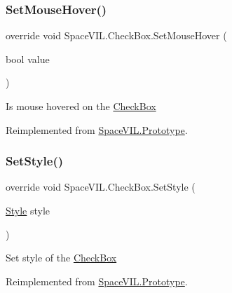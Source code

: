 \subsubsection{\texorpdfstring{Set\+Mouse\+Hover()}{SetMouseHover()}}
{\footnotesize\ttfamily override void Space\+V\+I\+L.\+Check\+Box.\+Set\+Mouse\+Hover (\begin{DoxyParamCaption}\item[{bool}]{value }\end{DoxyParamCaption})\hspace{0.3cm}{\ttfamily [virtual]}}



Is mouse hovered on the \mbox{\hyperlink{class_space_v_i_l_1_1_check_box}{Check\+Box}} 



Reimplemented from \mbox{\hyperlink{class_space_v_i_l_1_1_prototype}{Space\+V\+I\+L.\+Prototype}}.

\mbox{\label{class_space_v_i_l_1_1_check_box_a123c8ba848fb10601c5ee80681410f23}} 
\subsubsection{\texorpdfstring{Set\+Style()}{SetStyle()}}
{\footnotesize\ttfamily override void Space\+V\+I\+L.\+Check\+Box.\+Set\+Style (\begin{DoxyParamCaption}\item[{\mbox{\hyperlink{class_space_v_i_l_1_1_decorations_1_1_style}{Style}}}]{style }\end{DoxyParamCaption})\hspace{0.3cm}{\ttfamily [virtual]}}



Set style of the \mbox{\hyperlink{class_space_v_i_l_1_1_check_box}{Check\+Box}} 



Reimplemented from \mbox{\hyperlink{class_space_v_i_l_1_1_prototype_ae96644a6ace490afb376fb542161e541}{Space\+V\+I\+L.\+Prototype}}.

\mbox{\label{class_space_v_i_l_1_1_check_box_aa6659e84a3b86101b8af3396fefbe01d}} 
